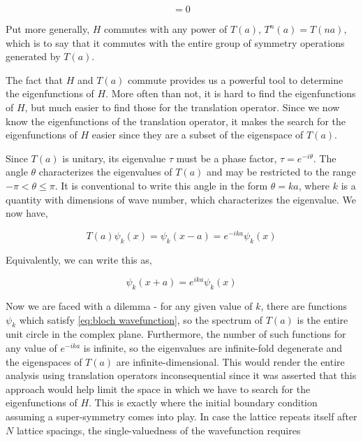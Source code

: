 \begin{equation}
    [T(a), H] = 0
\end{equation}

Put more generally, $H$ commutes with any power of $T(a)$, $T^{n}(a) = T(na)$, which is to say that it commutes with the entire group of symmetry operations generated by $T(a)$. \par

The fact that $H$ and $T(a)$ commute provides us a powerful tool to determine the eigenfunctions of $H$. More often than not, it is hard to find the eigenfunctions of $H$, but much easier to find those for the translation operator. Since we now know the eigenfunctions of the translation operator, it makes the search for the eigenfunctions of $H$ easier since they are a subset of the eigenspace of $T(a)$. \par

Since $T(a)$ is unitary, its eigenvalue $\tau$ must be a phase factor, $\tau = e^{-i\theta}$. The angle $\theta$ characterizes the eigenvalues of $T(a)$ and may be restricted to the range $-\pi < \theta \leq \pi$. It is conventional to write this angle in the form $\theta = ka$, where $k$ is a quantity with dimensions of wave number,
which characterizes the eigenvalue. We now have,

\begin{equation}
    T(a) \psi_{k}(x) = \psi_{k}(x-a) = e^{-ika}\psi_{k}(x)
\end{equation}

Equivalently, we can write this as,

\begin{equation}
\label{eq:bloch wavefunction}
    \psi_{k}(x+a) = e^{ika}\psi_{k}(x)
\end{equation}

Now we are faced with a dilemma - for any given value of $k$, there are functions $\psi_{k}$ which satisfy \ref{eq:bloch wavefunction}, so the spectrum of $T(a)$ is the entire unit circle in the complex plane. Furthermore, the number of such functions for any value of $e^{-ika}$ is infinite, so the eigenvalues are infinite-fold degenerate and the eigenspaces of $T(a)$ are infinite-dimensional. This would render the entire analysis using translation operators inconsequential since it was asserted that this approach would help limit the space in which we have to search for the eigenfunctions of $H$. This is exactly where the initial boundary condition assuming a super-symmetry comes into play. In case the lattice repeats itself after $N$ lattice spacings, the single-valuedness of the wavefunction requires

